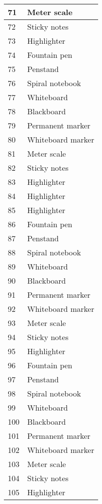 \documentclass{article}
\begin{document}
\begin{longtable}{|l|l|}
		\hline
		71 & Meter scale \\
		\hline
		72 & Sticky notes \\
		\hline
		73 & Highlighter \\
		\hline
		74 & Fountain pen \\
		\hline
		75 & Penstand \\
		\hline
		76 & Spiral notebook \\
		\hline
		77 & Whiteboard \\
		\hline
		78 & Blackboard \\
		\hline
		79 & Permanent marker \\
		\hline
		80 & Whiteboard marker \\
		\hline
		81 & Meter scale \\
		\hline
		82 & Sticky notes \\
		\hline
		83 & Highlighter \\
		\hline
		84 & Highlighter \\
		\hline
		85 & Highlighter \\
		\hline
		86 & Fountain pen \\
		\hline
		87 & Penstand \\
		\hline
		88 & Spiral notebook \\
		\hline
		89 & Whiteboard \\
		\hline
		90 & Blackboard \\
		\hline
		91 & Permanent marker \\
		\hline
		92 & Whiteboard marker \\
		\hline
		93 & Meter scale \\
		\hline
		94 & Sticky notes \\
		\hline
		95 & Highlighter \\
		\hline
		96 & Fountain pen \\
		\hline
		97 & Penstand \\
		\hline
		98 & Spiral notebook \\
		\hline
		99 & Whiteboard \\
		\hline
		100 & Blackboard \\
		\hline
		101 & Permanent marker \\
		\hline
		102 & Whiteboard marker \\
		\hline
		103 & Meter scale \\
		\hline
		104 & Sticky notes \\
		\hline
		105 & Highlighter \\
		\hline
	\end{longtable}
\end{document}
